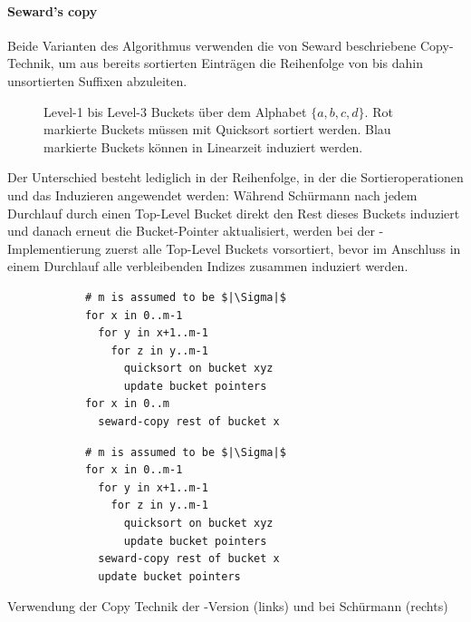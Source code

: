 \paragraph{Seward's copy}
Beide Varianten des Algorithmus verwenden die von Seward \cite{seward2000} beschriebene Copy-Technik, um aus bereits sortierten Einträgen die Reihenfolge von bis dahin unsortierten Suffixen abzuleiten. 
\begin{figure}[ht]
    \caption[Funktionsweise der Copy-Technik]{Level-1 bis Level-3 Buckets über dem Alphabet \(\{a, b, c, d\}\). Rot markierte Buckets müssen mit Quicksort sortiert werden. Blau markierte Buckets können in Linearzeit induziert werden.}
	\label{fig:seward}
\end{figure}
Der Unterschied besteht lediglich in der Reihenfolge, in der die Sortieroperationen und das Induzieren angewendet werden: Während Schürmann nach jedem Durchlauf durch einen Top-Level Bucket direkt den Rest dieses Buckets induziert und danach erneut die Bucket-Pointer aktualisiert, werden bei der \sacabench-Implementierung zuerst alle Top-Level Buckets vorsortiert, bevor im Anschluss in einem Durchlauf alle verbleibenden Indizes zusammen induziert werden. 
\begin{listing}[h]
    \begin{minipage}{0.5\textwidth}
        \begin{verbatim}
            # m is assumed to be $|\Sigma|$
            for x in 0..m-1
              for y in x+1..m-1
                for z in y..m-1
                  quicksort on bucket xyz
                  update bucket pointers
            for x in 0..m
              seward-copy rest of bucket x
        \end{verbatim}
    \end{minipage}
    \begin{minipage}{0.5\textwidth}
        \begin{verbatim}
            # m is assumed to be $|\Sigma|$
            for x in 0..m-1
              for y in x+1..m-1
                for z in y..m-1
                  quicksort on bucket xyz
                  update bucket pointers
              seward-copy rest of bucket x
              update bucket pointers
        \end{verbatim}
    \end{minipage}
    \caption[Verwendung der Copy Technik]{Verwendung der Copy Technik der \sacabench-Version (links) und bei Schürmann (rechts)}
\end{listing}

